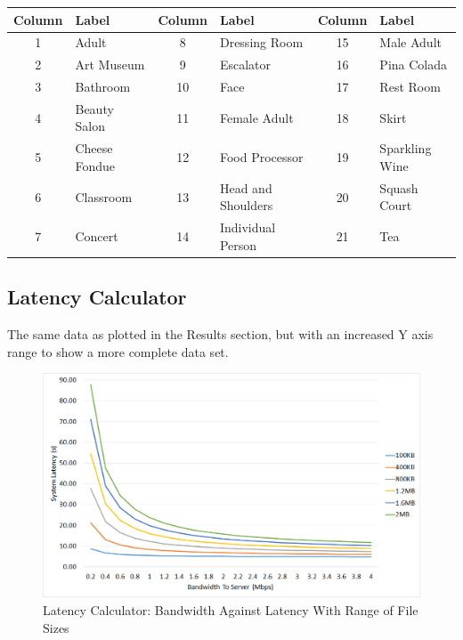 \documentclass{article}
\begin{document}
\begin{landscape}
\begin{table}
\centering
\begin{tabularx}{\textheight}{|c| X |c |X |c |l |}
\hline
Column &  Label & Column & Label & Column & Label\\
\hline
1&Adult& 8 &Dressing Room & 15&Male Adult \\
2&Art Museum & 9 &Escalator & 16 & Pina Colada\\
3&Bathroom &10&Face&17&Rest Room \\
4&Beauty Salon &11&Female Adult &18&Skirt\\
5&Cheese Fondue &12&Food Processor & 19&Sparkling Wine\\
6&Classroom &13&Head and Shoulders & 20&Squash Court\\
7&Concert &14&Individual Person&21&Tea\\
\hline
\end{tabularx}
\end{table}
\end{landscape}

\subsection{Latency Calculator}
The same data as plotted in the Results section, but with an increased Y axis range to show a more complete data set.  
\begin{figure}[h]
\caption{Latency Calculator: Bandwidth Against Latency With Range of File Sizes\label{fig:LatencyVsBandwidthMaxAxis}}
\includegraphics[width=\textwidth]{LatencyVsBandwidthMaxAxis}
\end{figure}











\printbibliography[title={Whole Bibliography}]
\end{document}
